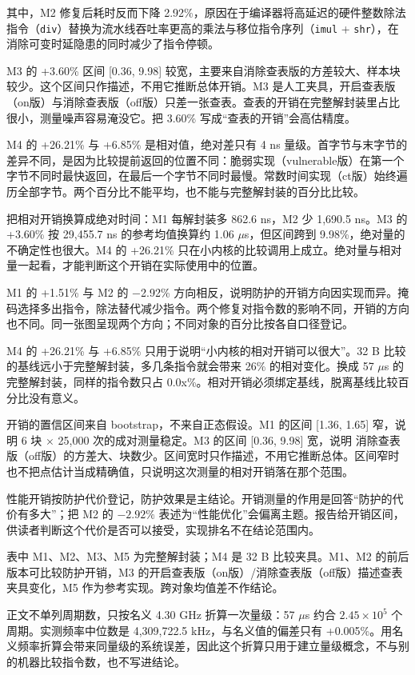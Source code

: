 其中，M2 修复后耗时反而下降 2.92\%，原因在于编译器将高延迟的硬件整数除法指令（\texttt{div}）替换为流水线吞吐率更高的乘法与移位指令序列（\texttt{imul} + \texttt{shr}），在消除可变时延隐患的同时减少了指令停顿。

M3 的 +3.60\% 区间 [0.36, 9.98] 较宽，主要来自消除查表版的方差较大、样本块较少。这个区间只作描述，不用它推断总体开销。M3 是人工夹具，开启查表版（on版）与消除查表版（off版）只差一张查表。查表的开销在完整解封装里占比很小，测量噪声容易淹没它。把 3.60\% 写成“查表的开销”会高估精度。

M4 的 +26.21\% 与 +6.85\% 是相对值，绝对差只有 4 ns 量级。首字节与末字节的差异不同，是因为比较提前返回的位置不同：脆弱实现（vulnerable版）在第一个字节不同时最快返回，在最后一个字节不同时最慢。常数时间实现（ct版）始终遍历全部字节。两个百分比不能平均，也不能与完整解封装的百分比比较。

把相对开销换算成绝对时间：M1 每解封装多 862.6 ns，M2 少 1,690.5 ns。M3 的 +3.60\% 按 29,455.7 ns 的参考均值换算约 1.06 $\mu$s，但区间跨到 9.98\%，绝对量的不确定性也很大。M4 的 +26.21\% 只在小内核的比较调用上成立。绝对量与相对量一起看，才能判断这个开销在实际使用中的位置。%

M1 的 +1.51\% 与 M2 的 −2.92\% 方向相反，说明防护的开销方向因实现而异。掩码选择多出指令，除法替代减少指令。两个修复对指令数的影响不同，开销的方向也不同。同一张图呈现两个方向；不同对象的百分比按各自口径登记。

M4 的 +26.21\% 与 +6.85\% 只用于说明“小内核的相对开销可以很大”。32 B 比较的基线远小于完整解封装，多几条指令就会带来 26\% 的相对变化。换成 57 $\mu$s 的完整解封装，同样的指令数只占 0.0x\%。相对开销必须绑定基线，脱离基线比较百分比没有意义。

开销的置信区间来自 bootstrap，不来自正态假设。M1 的区间 [1.36, 1.65] 窄，说明 6 块 $\times$ 25,000 次的成对测量稳定。M3 的区间 [0.36, 9.98] 宽，说明 消除查表版（off版）的方差大、块数少。区间宽时只作描述，不用它推断总体。区间窄时也不把点估计当成精确值，只说明这次测量的相对开销落在那个范围。



性能开销按防护代价登记，防护效果是主结论。开销测量的作用是回答“防护的代价有多大”；把 M2 的 $-2.92\%$ 表述为“性能优化”会偏离主题。报告给开销区间，供读者判断这个代价是否可以接受，实现排名不在结论范围内。

表中 M1、M2、M3、M5 为完整解封装；M4 是 32 B 比较夹具。M1、M2 的前后版本可比较防护开销，M3 的开启查表版（on版）/消除查表版（off版）描述查表夹具变化，M5 作为参考实现。跨对象均值差不作结论。

正文不单列周期数，只按名义 4.30 GHz 折算一次量级：57 $\mu$s 约合 $2.45\times10^5$ 个周期。实测频率中位数是 4,309,722.5 kHz，与名义值的偏差只有 +0.005\%。用名义频率折算会带来同量级的系统误差，因此这个折算只用于建立量级概念，不与别的机器比较指令数，也不写进结论。%


